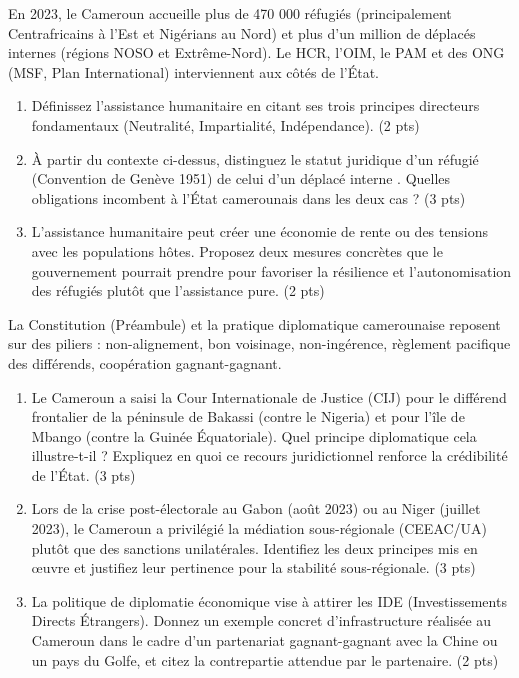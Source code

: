 \documentclass[11pt]{article}
\begin{document}
\begin{exercice}
En 2023, le Cameroun accueille plus de 470 000 réfugiés (principalement Centrafricains à l'Est et Nigérians au Nord) et plus d'un million de déplacés internes (régions NOSO et Extrême-Nord). Le HCR, l'OIM, le PAM et des ONG (MSF, Plan International) interviennent aux côtés de l'État.
\begin{enumerate}
    \item Définissez l'assistance humanitaire en citant ses trois principes directeurs fondamentaux (Neutralité, Impartialité, Indépendance). (2 pts)
    \item À partir du contexte ci-dessus, distinguez le statut juridique d'un \og réfugié \fg{} (Convention de Genève 1951) de celui d'un \og déplacé interne \fg{}. Quelles obligations incombent à l'État camerounais dans les deux cas ? (3 pts)
    \item L'assistance humanitaire peut créer une \og économie de rente \fg{} ou des tensions avec les populations hôtes. Proposez deux mesures concrètes que le gouvernement pourrait prendre pour favoriser la résilience et l'autonomisation des réfugiés plutôt que l'assistance pure. (2 pts)
\end{enumerate}
\end{exercice}

\begin{exercice}
La Constitution (Préambule) et la pratique diplomatique camerounaise reposent sur des piliers : non-alignement, bon voisinage, non-ingérence, règlement pacifique des différends, coopération gagnant-gagnant.
\begin{enumerate}
    \item Le Cameroun a saisi la Cour Internationale de Justice (CIJ) pour le différend frontalier de la péninsule de Bakassi (contre le Nigeria) et pour l'île de Mbango (contre la Guinée Équatoriale). Quel principe diplomatique cela illustre-t-il ? Expliquez en quoi ce recours juridictionnel renforce la crédibilité de l'État. (3 pts)
    \item Lors de la crise post-électorale au Gabon (août 2023) ou au Niger (juillet 2023), le Cameroun a privilégié la médiation sous-régionale (CEEAC/UA) plutôt que des sanctions unilatérales. Identifiez les deux principes mis en œuvre et justifiez leur pertinence pour la stabilité sous-régionale. (3 pts)
    \item La politique de \og diplomatie économique \fg{} vise à attirer les IDE (Investissements Directs Étrangers). Donnez un exemple concret d'infrastructure réalisée au Cameroun dans le cadre d'un partenariat \og gagnant-gagnant \fg{} avec la Chine ou un pays du Golfe, et citez la contrepartie attendue par le partenaire. (2 pts)
\end{enumerate}
\end{exercice}
\end{document}
